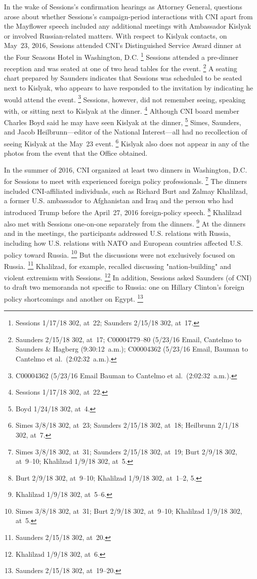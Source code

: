 In the wake of Sessions's confirmation hearings as Attorney General, questions arose about whether Sessions's campaign-period interactions with CNI apart from the Mayflower speech included any additional meetings with Ambassador Kislyak or involved Russian-related matters.
With respect to Kislyak contacts, on May~23, 2016, Sessions attended CNI's Distinguished Service Award dinner at the Four Seasons Hotel in Washington, D.C.%
\footnote{Sessions 1/17/18 302, at~22;
Saunders 2/15/18 302, at~17.}
Sessions attended a pre-dinner reception and was seated at one of two head tables for the event.%
\footnote{Saunders 2/15/18 302, at~17;
C00004779--80 (5/23/16 Email, Cantelmo to Saunders \& Hagberg (9:30:12~a.m.);
C00004362 (5/23/16 Email, Bauman to Cantelmo et al.\ (2:02:32~a.m.).}
A seating chart prepared by Saunders indicates that Sessions was scheduled to be seated next to Kislyak, who appears to have responded to the invitation by indicating he would attend the event.%
\footnote{C00004362 (5/23/16 Email Bauman to Cantelmo et al.\ (2:02:32~a.m.).}
Sessions, however, did not remember seeing, speaking with, or sitting next to Kislyak at the dinner.%
\footnote{Sessions 1/17/18 302, at~22.}
Although CNI board member Charles Boyd said he may have seen Kislyak at the dinner,%
\footnote{Boyd 1/24/18 302, at~4.}
Simes, Saunders, and Jacob Heilbrunn---editor of the National Interest---all had no recollection of seeing Kislyak at the May~23 event.%
\footnote{Simes 3/8/18 302, at~23;
Saunders 2/15/18 302, at~18;
Heilbrunn 2/1/18 302, at~7.}
Kislyak also does not appear in any of the photos from the event that the Office obtained.

In the summer of 2016, CNI organized at least two dinners in Washington, D.C. for Sessions to meet with experienced foreign policy professionals.%
\footnote{Simes 3/8/18 302, at~31;
Saunders 2/15/18 302, at~19;
Burt 2/9/18 302, at~9--10;
Khalilzad 1/9/18 302, at~5.}
The dinners included CNI-affiliated individuals, such as Richard Burt and Zalmay Khalilzad, a former U.S. ambassador to Afghanistan and Iraq and the person who had introduced Trump before the April~27, 2016 foreign-policy speech.%
\footnote{Burt 2/9/18 302, at~9--10;
Khalilzad 1/9/18 302, at~1--2, 5.}
Khalilzad also met with Sessions one-on-one separately from the dinners.%
\footnote{Khalilzad 1/9/18 302, at~5--6.}
At the dinners and in the meetings, the participants addressed U.S. relations with Russia, including how U.S. relations with NATO and European countries affected U.S. policy toward Russia.%
\footnote{Simes 3/8/18 302, at~31;
Burt 2/9/18 302, at~9--10;
Khalilzad 1/9/18 302, at~5.}
But the discussions were not exclusively focused on Russia.%
\footnote{Saunders 2/15/18 302, at~20.}
Khalilzad, for example, recalled discussing "nation-building" and violent extremism with Sessions.%
\footnote{Khalilzad 1/9/18 302, at~6.}
In addition, Sessions asked Saunders (of CNI) to draft two memoranda not specific to Russia: one on Hillary Clinton's foreign policy shortcomings and another on Egypt.%
\footnote{Saunders 2/15/18 302, at~19--20.}

